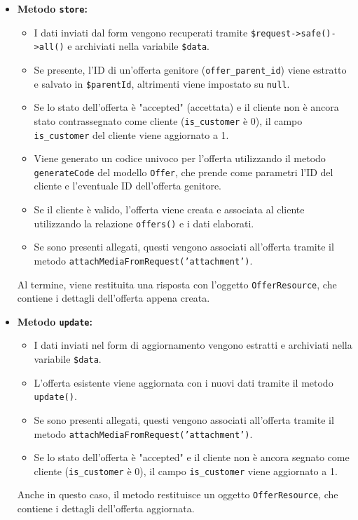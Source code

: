 \begin{itemize}
    \item \textbf{Metodo \texttt{store}:} 
    \begin{itemize}
        \item I dati inviati dal form vengono recuperati tramite \texttt{\$request->safe()->all()} e archiviati nella variabile \texttt{\$data}.
        \item Se presente, l'ID di un'offerta genitore (\texttt{offer\_parent\_id}) viene estratto e salvato in \texttt{\$parentId}, altrimenti viene impostato su \texttt{null}.
        \item Se lo stato dell'offerta è "accepted" (accettata) e il cliente non è ancora stato contrassegnato come cliente (\texttt{is\_customer} è 0), il campo \texttt{is\_customer} del cliente viene aggiornato a 1.
        \item Viene generato un codice univoco per l'offerta utilizzando il metodo \texttt{generateCode} del modello \texttt{Offer}, che prende come parametri l'ID del cliente e l'eventuale ID dell'offerta genitore.
        \item Se il cliente è valido, l'offerta viene creata e associata al cliente utilizzando la relazione \texttt{offers()} e i dati elaborati.
        \item Se sono presenti allegati, questi vengono associati all'offerta tramite il metodo \texttt{attachMediaFromRequest('attachment')}.
    \end{itemize}
    Al termine, viene restituita una risposta con l'oggetto \texttt{OfferResource}, che contiene i dettagli dell'offerta appena creata.

    \item \textbf{Metodo \texttt{update}:}
    \begin{itemize}
        \item I dati inviati nel form di aggiornamento vengono estratti e archiviati nella variabile \texttt{\$data}.
        \item L'offerta esistente viene aggiornata con i nuovi dati tramite il metodo \texttt{update()}.
        \item Se sono presenti allegati, questi vengono associati all'offerta tramite il metodo \texttt{attachMediaFromRequest('attachment')}.
        \item Se lo stato dell'offerta è "accepted" e il cliente non è ancora segnato come cliente (\texttt{is\_customer} è 0), il campo \texttt{is\_customer} viene aggiornato a 1.
    \end{itemize}
    Anche in questo caso, il metodo restituisce un oggetto \texttt{OfferResource}, che contiene i dettagli dell'offerta aggiornata.
\end{itemize}

